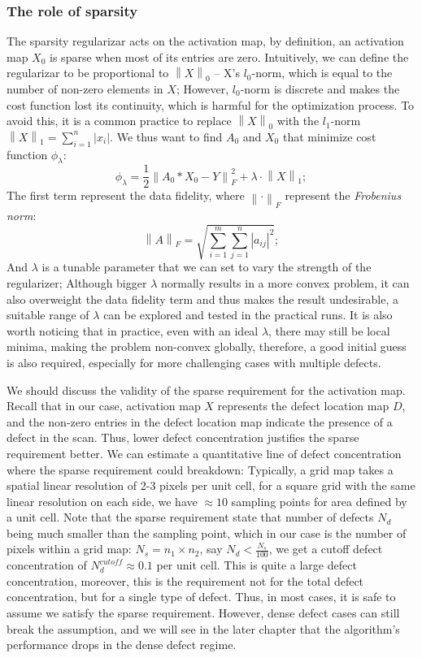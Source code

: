 \subsubsection{The role of sparsity}
The sparsity regularizar acts on the activation map, by definition, an activation map $X_0$ is sparse when most of its entries are zero. Intuitively, we can define the regularizar to be proportional to $\left\lVert X\right\rVert_0$ -- X's $l_0$-norm, which is equal to the number of non-zero elements in $X$; However, $l_0$-norm is discrete and makes the cost function lost its continuity, which is harmful for the optimization process. To avoid this, it is a common practice to replace $\left\lVert X\right\rVert_0$ with the $l_1$-norm $\left\lVert X\right\rVert_1 = \sum_{i=1}^{n}\vert x_i \vert$. We thus want to find $A_0$ and $X_0$ that minimize cost function $\phi_{\lambda}$:
\begin{equation}
	\phi_{\lambda} = \frac{1}{2}\left\lVert A_0 * X_0 - Y \right\rVert^2_F + \lambda \cdot \left\lVert X\right\rVert_1;
\end{equation}
\noindent The first term represent the data fidelity, where $\left\lVert \cdot\right\rVert_F$ represent the \textit{Frobenius norm}: 
\[
\left\lVert A \right\rVert_F = \sqrt{ \sum_{i=1}^{m} \sum_{j=1}^{n} |a_{ij}|^2 };
\] 
\noindent And $\lambda$ is a tunable parameter that we can set to vary the strength of the regularizer; Although bigger $\lambda$ normally results in a more convex problem, it can also overweight the data fidelity term and thus makes the result undesirable, a suitable range of $\lambda$ can be explored and tested in the practical runs. It is also worth noticing that in practice, even with an ideal $\lambda$, there may still be local minima, making the problem non-convex globally, therefore, a good initial guess is also required, especially for more challenging cases with multiple defects. 

We should discuss the validity of the sparse requirement for the activation map. Recall that in our case, activation map $X$ represents the defect location map $D$, and the non-zero entries in the defect location map indicate the presence of a defect in the scan. Thus, lower defect concentration justifies the sparse requirement better. We can estimate a quantitative line of defect concentration where the sparse requirement could breakdown: Typically, a grid map takes a spatial linear resolution of 2-3 pixels per unit cell, for a square grid with the same linear resolution on each side, we have $\approx 10$ sampling points for area defined by a unit cell. Note that the sparse requirement state that number of defects $N_d$ being much smaller than the sampling point, which in our case is the number of pixels within a grid map: $N_s = n_1 \times n_2$, say $N_d < \frac{N_s}{100}$, we get a cutoff defect concentration of $N_d^{cutoff} \approx 0.1$ per unit cell. This is quite a large defect concentration, moreover, this is the requirement not for the total defect concentration, but for a single type of defect. Thus, in most cases, it is safe to assume we satisfy the sparse requirement. However, dense defect cases can still break the assumption, and we will see in the later chapter that the algorithm's performance drops in the dense defect regime. 

